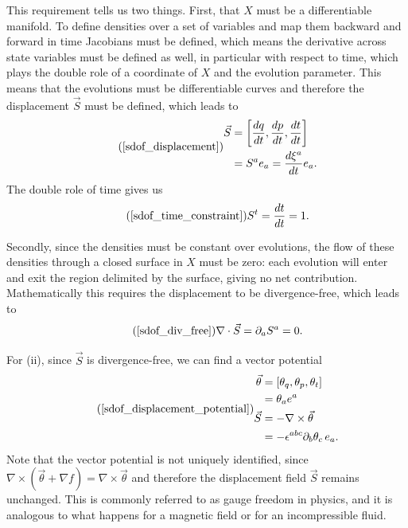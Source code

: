 \documentclass[10pt,twocolumn, nofootinbib]{revtex4-2}
\begin{document}
This requirement tells us two things. First, that $X$ must be a differentiable manifold. To define densities over a set of variables and map them backward and forward in time Jacobians must be defined, which means the derivative across state variables must be defined as well, in particular with respect to time, which plays the double role of a coordinate of $X$ and the evolution parameter. This means that the evolutions must be differentiable curves and therefore the displacement $\vec{S}$ must be defined, which leads to
\begin{equation}
\tag*{(\ref{sdof_displacement})}
	\begin{aligned}
		\vec{S} &= \left[ \frac{dq}{dt},\frac{dp}{dt},\frac{dt}{dt} \right] \\
		&= S^a e_a = \frac{d\xi^a}{dt} e_a .
	\end{aligned}
\end{equation}
The double role of time gives us
\begin{equation}
\tag*{(\ref{sdof_time_constraint})}
 	S^t=\frac{dt}{dt}=1.
 \end{equation}

Secondly, since the densities must be constant over evolutions, the flow of these densities through a closed surface in $X$ must be zero: each evolution will enter and exit the region delimited by the surface, giving no net contribution. Mathematically this requires the displacement to be divergence-free, which leads to
\begin{equation}
\tag*{(\ref{sdof_div_free})}
	\nabla \cdot \vec{S} = \partial_a S^a = 0.
\end{equation}

For (ii), since $\vec{S}$ is divergence-free, we can find a vector potential
\begin{equation}
\tag*{(\ref{sdof_displacement_potential})}
	\begin{aligned}
		\vec{\theta} &= [\theta_q, \theta_p, \theta_t] \\
		&= \theta_a e^a \\
		\vec{S} &= - \nabla \times \vec{\theta} \\
		&= - \epsilon^{abc} \partial_b \theta_c \, e_a. \\
	\end{aligned}
\end{equation}
Note that the vector potential is not uniquely identified, since $\nabla \times(\vec{\theta} + \nabla f) = \nabla \times \vec{\theta}$ and therefore the displacement field $\vec{S}$ remains unchanged. This is commonly referred to as gauge freedom in physics, and it is analogous to what happens for a magnetic field or for an incompressible fluid.
\end{document}
